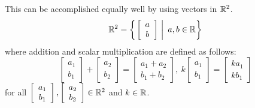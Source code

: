 \documentclass[pdf,9pt]{beamer}
\begin{document}
\begin{frame}[fragile]
\begin{example}[continued]
    This can be accomplished equally well by using vectors in $\mathbb{R}^2$.
    \[ \mathbb{R}^2=\left\{\left. \left[\begin{array}{c} a \\ b \end{array}\right]
    ~\right|~ a,b\in\mathbb{R} \right\}\]
    where addition and scalar multiplication are defined as follows:
    \[
	\left[\begin{array}{c}  a_1     \\ b_1     \end{array}\right]
	+\left[\begin{array}{c} a_2     \\ b_2     \end{array}\right]
	=\left[\begin{array}{c} a_1+a_2 \\ b_1+b_2 \end{array}\right],~
	k\left[\begin{array}{c} a_1     \\ b_1     \end{array}\right]
	=\left[\begin{array}{c} ka_1    \\ kb_1    \end{array}\right]
    \]
    for all $\left[\begin{array}{c} a_1 \\ b_1 \end{array}\right],
    \left[\begin{array}{c} a_2 \\ b_2 \end{array}\right]
    \in\mathbb{R}^2$ and $k\in\mathbb{R}$.
 \end{example}
\end{frame}
\end{document}
